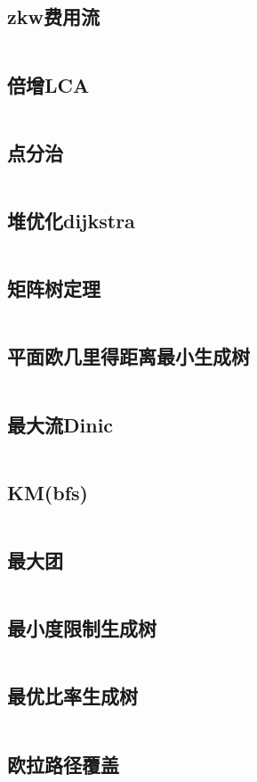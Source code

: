 \documentclass[UTF8]{ctexart}
\begin{document}
\subsection{zkw费用流}
\inputminted{cpp}{graphtheory/zkw费用流.cpp}
\subsection{倍增LCA}
\inputminted{cpp}{graphtheory/倍增LCA.cpp}
\subsection{点分治}
\inputminted{cpp}{graphtheory/点分治.cpp}
\subsection{堆优化dijkstra}
\inputminted{cpp}{graphtheory/堆优化dijkstra.cpp}
\subsection{矩阵树定理}
\inputminted{cpp}{graphtheory/矩阵树定理.cpp}
\subsection{平面欧几里得距离最小生成树}
\inputminted{cpp}{graphtheory/平面欧几里得距离最小生成树.cpp}
\subsection{最大流Dinic}
\inputminted{cpp}{graphtheory/最大流Dinic.cpp}
\subsection{KM(bfs)}
\inputminted{cpp}{graphtheory/KM_bfs.cpp}
\subsection{最大团}
\inputminted{cpp}{graphtheory/最大团.cpp}
\subsection{最小度限制生成树}
\inputminted{cpp}{graphtheory/最小度限制生成树.cpp}
\subsection{最优比率生成树}
\inputminted{cpp}{graphtheory/最优比率生成树.cpp}
\subsection{欧拉路径覆盖}
\inputminted{cpp}{graphtheory/欧拉路径覆盖.cpp}
\end{document}
